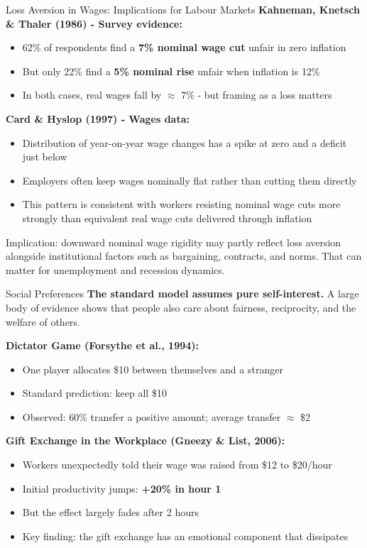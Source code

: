 \documentclass[10pt]{beamer}
\begin{document}
\begin{frame}[allowframebreaks]{Loss Aversion in Wages: Implications for Labour Markets}
\textbf{Kahneman, Knetsch \& Thaler (1986) - Survey evidence:}

\begin{itemize}
\item 62\% of respondents find a \textbf{7\% nominal wage cut} unfair in zero inflation
\item But only 22\% find a \textbf{5\% nominal rise} unfair when inflation is 12\%
\item In both cases, real wages fall by $\approx$ 7\% - but \alert{framing as a loss matters}
\end{itemize}


\textbf{Card \& Hyslop (1997) - Wages data:}
\begin{itemize}
\item Distribution of year-on-year wage changes has a \alert{spike at zero} and a deficit just below
\item Employers often keep wages nominally flat rather than cutting them directly
\item This pattern is consistent with workers resisting nominal wage cuts more strongly than equivalent real wage cuts delivered through inflation
\end{itemize}


\alert{Implication:} downward nominal wage rigidity may partly reflect loss aversion alongside institutional factors such as bargaining, contracts, and norms. That can matter for unemployment and recession dynamics.
\end{frame}


\begin{frame}{Social Preferences}
\textbf{The standard model assumes pure self-interest.}
A large body of evidence shows that people also care about fairness, reciprocity, and the welfare of others.


\textbf{Dictator Game (Forsythe et al., 1994):}
\begin{itemize}
\item One player allocates \$10 between themselves and a stranger
\item Standard prediction: keep all \$10
\item \alert{Observed:} 60\% transfer a positive amount; average transfer $\approx$ \$2
\end{itemize}


\textbf{Gift Exchange in the Workplace (Gneezy \& List, 2006):}
\begin{itemize}
\item Workers unexpectedly told their wage was raised from \$12 to \$20/hour
\item Initial productivity jumps: \textbf{+20\% in hour 1}
\item But the effect largely fades after 2 hours
\item \alert{Key finding:} the gift exchange has an emotional component that dissipates
\end{itemize}
\end{frame}
\end{document}
